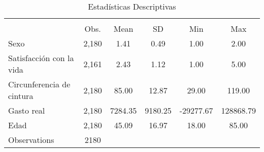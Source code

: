 \begin{table}[htbp]\centering
\def\sym#1{\ifmmode^{#1}\else\(^{#1}\)\fi}
\caption{Estadísticas Descriptivas}
\begin{tabular}{l*{1}{ccccc}}
\hline\hline
                    &\multicolumn{5}{c}{}                                            \\
                    &        Obs.&        Mean&          SD&         Min&         Max\\
\hline
Sexo                &       2,180&        1.41&        0.49&        1.00&        2.00\\
Satisfacción con la vida&       2,161&        2.43&        1.12&        1.00&        5.00\\
Circunferencia de cintura&       2,180&       85.00&       12.87&       29.00&      119.00\\
Gasto real          &       2,180&     7284.35&     9180.25&   -29277.67&   128868.79\\
Edad                &       2,180&       45.09&       16.97&       18.00&       85.00\\
\hline
Observations        &        2180&            &            &            &            \\
\hline\hline
\end{tabular}
\end{table}
